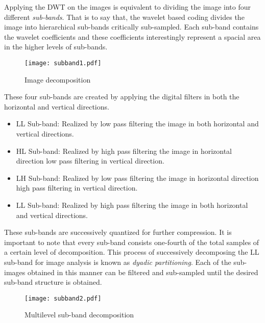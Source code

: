 \documentclass[./A14_Report.tex]{subfiles}
\begin{document}
\par

Applying the DWT on the images is equivalent to dividing the image into four
different \textit{sub-bands}. That is to say that, the wavelet based coding
divides the image into hierarchical sub-bands critically sub-sampled. Each
sub-band contains the wavelet coefficients and these coefficients interestingly
represent a spacial area in the higher levels of sub-bands.

\FloatBarrier
\begin{figure}[htpb]
    \centering
    \texttt{[image: subband1.pdf]}
    \caption{Image decomposition}%
    \label{fig:subband1}
\end{figure}
\FloatBarrier

\pagebreak

These four sub-bands are created by applying the digital filters in both the
horizontal and vertical directions.
\begin{itemize}
    \item LL Sub-band: Realized by low pass filtering the image in both
        horizontal and vertical directions.
    \item HL Sub-band: Realized by high pass filtering the image in horizontal
        direction low pass filtering in vertical direction.
    \item LH Sub-band: Realized by low pass filtering the image in horizontal
        direction high pass filtering in vertical direction.
    \item LL Sub-band: Realized by high pass filtering the image in both
        horizontal and vertical directions.
\end{itemize}

These sub-bands are successively quantized for further compression. It is
important to note that every sub-band consists one-fourth of the total samples
of a certain level of decomposition.  This process of successively decomposing
the LL sub-band for image analysis is known as \textit{dyadic partitioning}.
Each of the sub-images obtained in this manner can be filtered and sub-sampled
until the desired sub-band structure is obtained.

\FloatBarrier
\begin{figure}[htpb]
    \centering
    \texttt{[image: subband2.pdf]}
    \caption{Multilevel sub-band decomposition}%
    \label{fig:subband2}
\end{figure}
\FloatBarrier
\end{document}
